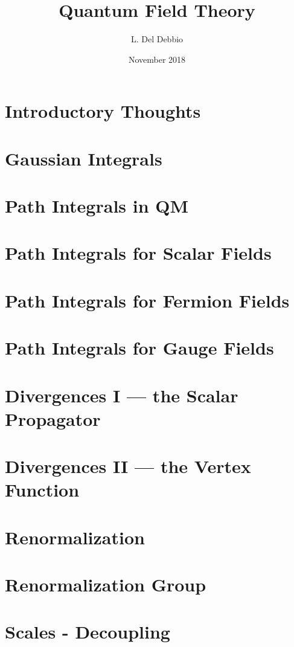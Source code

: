 \documentclass[11pt]{scrreprt}
\title{Quantum Field Theory}
\author{L. Del Debbio}
\date{November 2018}
\begin{document}

\clearemptydoublepage
\tableofcontents
\clearemptydoublepage


\chapter*{Introductory Thoughts}
\label{chap:intro}


\chapter{Gaussian Integrals}
\label{chap:lec0}


\chapter{Path Integrals in QM}
\label{chap:lec1}


\chapter{Path Integrals for Scalar Fields}
\label{cha:path-integr-scal}



\chapter{Path Integrals for Fermion Fields}
\label{cha:path-integr-ferm}


\chapter{Path Integrals for Gauge Fields}
\label{cha:path-integrals-gauge}



\chapter{Divergences I --- the Scalar Propagator}
\label{cha:divergences-i-scalar}



\chapter{Divergences II --- the Vertex Function}
\label{cha:diverg-ii-vert}



\chapter{Renormalization}
\label{cha:renormalization}
% 


\chapter{Renormalization Group}
\label{cha:renorm-group}

\chapter{Scales - Decoupling}
\label{cha:scales-decoupling}

\printindex
\end{document}
